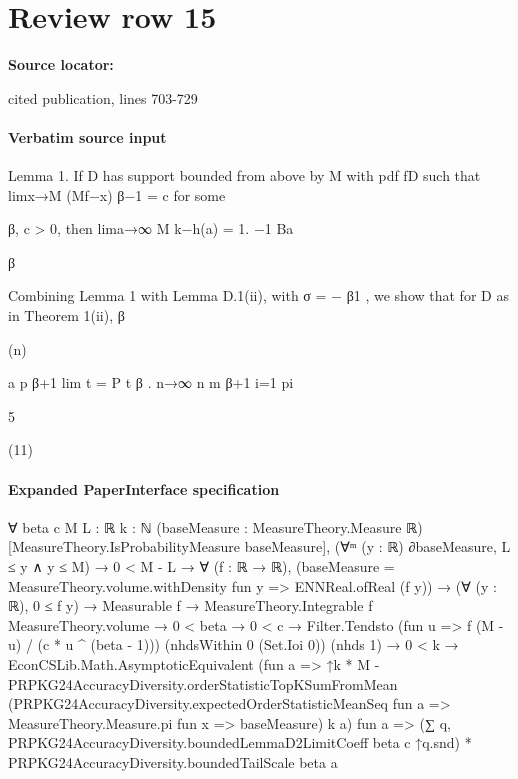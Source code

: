 \documentclass[10pt]{article}
\begin{document}
\section*{Review row 15}
\textbf{Source locator:} {\footnotesize\raggedright cited publication, lines 703-\allowbreak{}729\par}
\paragraph{Verbatim source input}
\begin{ReviewVerbatim}
Lemma 1. If D has support bounded from above by M with pdf fD such that limx→M (Mf−x)
β−1 = c for some

β, c > 0, then lima→∞ M k−h(a)
= 1.
−1
Ba

β

Combining Lemma 1 with Lemma D.1(ii), with σ = − β1 , we show that for D as in Theorem 1(ii),
β

(n)

a
p β+1
lim t = P t
β .
n→∞ n
m
β+1
i=1 pi

5

(11)
\end{ReviewVerbatim}


\paragraph{Expanded PaperInterface specification}
\begin{ReviewVerbatim}
∀ {beta c M L : ℝ} {k : ℕ} (baseMeasure : MeasureTheory.Measure ℝ) [MeasureTheory.IsProbabilityMeasure baseMeasure],
  (∀ᵐ (y : ℝ) ∂baseMeasure, L ≤ y ∧ y ≤ M) →
    0 < M - L →
      ∀ (f : ℝ → ℝ),
        (baseMeasure = MeasureTheory.volume.withDensity fun y => ENNReal.ofReal (f y)) →
          (∀ (y : ℝ), 0 ≤ f y) →
            Measurable f →
              MeasureTheory.Integrable f MeasureTheory.volume →
                0 < beta →
                  0 < c →
                    Filter.Tendsto (fun u => f (M - u) / (c * u ^ (beta - 1))) (nhdsWithin 0 (Set.Ioi 0)) (nhds 1) →
                      0 < k →
                        EconCSLib.Math.AsymptoticEquivalent
                          (fun a =>
                            ↑k * M -
                              PRPKG24AccuracyDiversity.orderStatisticTopKSumFromMean
                                (PRPKG24AccuracyDiversity.expectedOrderStatisticMeanSeq fun a =>
                                  MeasureTheory.Measure.pi fun x => baseMeasure)
                                k a)
                          fun a =>
                          (∑ q, PRPKG24AccuracyDiversity.boundedLemmaD2LimitCoeff beta c ↑q.snd) *
                            PRPKG24AccuracyDiversity.boundedTailScale beta a
\end{ReviewVerbatim}
\end{document}
